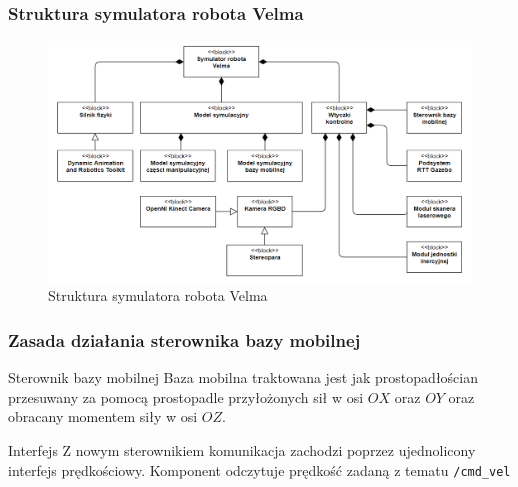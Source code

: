 \begin{frame}
    \frametitle{Struktura symulatora robota Velma} 
    \begin{figure}[b]
        \label{sim_system}
        \centering
        \def\svgwidth{\columnwidth}
        \vspace{0.1cm}
        \includegraphics[scale=0.35]{images/sim_system.png}
        \vspace{0.1cm}
        \caption{Struktura symulatora robota Velma}
    \end{figure}
\end{frame}

\begin{frame}
    \frametitle{Zasada działania sterownika bazy mobilnej} 
    \begin{block}{Sterownik bazy mobilnej}
        Baza mobilna traktowana jest jak prostopadłościan przesuwany za pomocą prostopadle przyłożonych
        sił w osi $OX$ oraz $OY$ oraz obracany momentem siły w osi $OZ$.
    \end{block}

    \begin{block}{Interfejs}
        Z nowym sterownikiem komunikacja zachodzi poprzez ujednolicony interfejs prędkościowy.
        Komponent odczytuje prędkość zadaną z tematu \texttt{/cmd\_{}vel}
    \end{block}
\end{frame}

